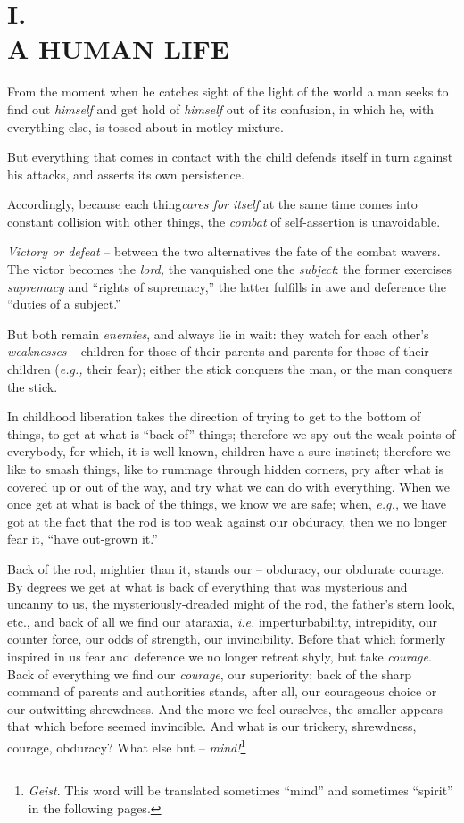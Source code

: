 
\chapter[I. A Human Life]{\centering I.\\
A HUMAN LIFE}

From the moment when he catches sight of the light of the world a man seeks to 
find out \textit{himself} and get hold of \textit{himself} out of its 
confusion, in which he, with everything else, is tossed about in motley 
mixture.

But everything that comes in contact with the child defends itself in turn 
against his attacks, and asserts its own persistence.

Accordingly, because each thing\textit{cares for itself} at the same time 
comes into constant collision with other things, the \textit{combat} of 
self-assertion is unavoidable.

\textit{Victory or defeat} -- between the two alternatives the fate of the 
combat wavers. The victor becomes the \textit{lord,} the vanquished one the 
\textit{subject}: the former exercises \textit{supremacy} and ``rights of 
supremacy,'' the latter fulfills in awe and deference the ``duties of a 
subject.''

But both remain \textit{enemies}, and always lie in wait: they watch for each 
other's \textit{weaknesses} -- children for those of their parents and parents 
for those of their children (\textit{e.g.,} their fear); either the stick 
conquers the man, or the man conquers the stick.

In childhood liberation takes the direction of trying to get to the bottom of 
things, to get at what is ``back of'' things; therefore we spy out the weak 
points of everybody, for which, it is well known, children have a sure 
instinct; therefore we like to smash things, like to rummage through hidden 
corners, pry after what is covered up or out of the way, and try what we can 
do with everything. When we once get at what is back of the things, we know we 
are safe; when, \textit{e.g.,} we have got at the fact that the rod is too 
weak against our obduracy, then we no longer fear it, ``have out-grown it.''

Back of the rod, mightier than it, stands our -- obduracy, our obdurate 
courage. By degrees we get at what is back of everything that was mysterious 
and uncanny to us, the mysteriously-dreaded might of the rod, the father's 
stern look, etc., and back of all we find our ataraxia, \textit{i.e.} 
imperturbability, intrepidity, our counter force, our odds of strength, our 
invincibility. Before that which formerly inspired in us fear and deference we 
no longer retreat shyly, but take \textit{courage}. Back of everything we find 
our \textit{courage}, our superiority; back of the sharp command of parents 
and authorities stands, after all, our courageous choice or our outwitting 
shrewdness. And the more we feel ourselves, the smaller appears that which 
before seemed invincible. And what is our trickery, shrewdness, courage, 
obduracy? What else but -- \textit{mind!}\footnote{\textit{Geist}. This word 
will be translated sometimes ``mind'' and sometimes ``spirit'' in the 
following pages.}

